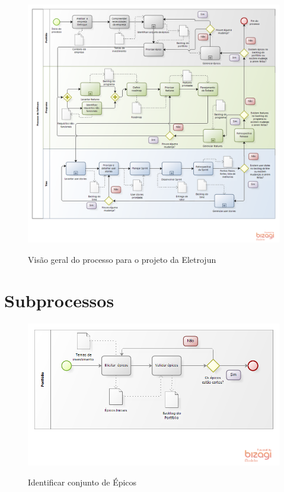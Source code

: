\FloatBarrier
\begin{figure}[!htpd]
		\centering
		\includegraphics[scale=0.55]{figuras/Eletrojun}
		\label{img:processoeletrojun}
		\caption{Visão geral do processo para o projeto da Eletrojun}
\end{figure}
\FloatBarrier

\section {Subprocessos}

\FloatBarrier
\begin{figure}[!htpd]
		\centering
		\includegraphics[scale=0.7]{figuras/epicosPRI}
		\label{img:time}
		\caption{Identificar conjunto de Épicos}
\end{figure}
\FloatBarrier


